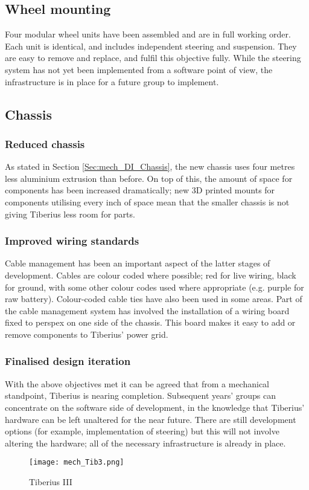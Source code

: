 \subsection{Wheel mounting}
Four modular wheel units have been assembled and are in full working order. Each unit is identical, and includes independent steering and suspension. They are easy to remove and replace, and fulfil this objective fully. While the steering system has not yet been implemented from a software point of view, the infrastructure is in place for a future group to implement.

\subsection{Chassis}
\subsubsection{Reduced chassis}
As stated in Section \ref{Sec:mech_DI_Chassis}, the new chassis uses four metres less aluminium extrusion than before. On top of this, the amount of space for components has been increased dramatically; new 3D printed mounts for components utilising every inch of space mean that the smaller chassis is not giving Tiberius less room for parts.

\subsubsection{Improved wiring standards}
Cable management has been an important aspect of the latter stages of development. Cables are colour coded where possible; red for live wiring, black for ground, with some other colour codes used where appropriate (e.g. purple for raw battery). Colour-coded cable ties have also been used in some areas.
\newline
Part of the cable management system has involved the installation of a wiring board fixed to perspex on one side of the chassis. This board makes it easy to add or remove components to Tiberius' power grid.

\subsubsection{Finalised design iteration}
With the above objectives met it can be agreed that from a mechanical standpoint, Tiberius is nearing completion. Subsequent years' groups can concentrate on the software side of development, in the knowledge that Tiberius' hardware can be left unaltered for the near future. There are still development options (for example, implementation of steering) but this will not involve altering the hardware; all of the necessary infrastructure is already in place.
\begin{figure}[!htb]
\begin{center}
\texttt{[image: mech\_Tib3.png]}
\end{center}
\caption{Tiberius III}
\label{fig:mech_tib3}
\end{figure}